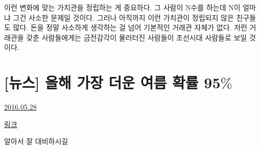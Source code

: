 이런 변화에 맞는 가치관을 정립하는 게 중요하다. 그 사람이 N수를 하는데 N이 얼마냐 그건 사소한 문제일 것이다.
그러나 아직까지 이런 가치관이 정립되지 않은 친구들도 많다. 돈을 정말 사소하게 생각하는 걸 넘어 기본적인 거래관 자체가 없다.
저런 거래관을 갖춘 사람들에게는 금전감각이 물러터진 사람들이 조선시대 사람들로 보일 것이다.
\vspace{5mm}






\section{[뉴스] 올해 가장 더운 여름 확률 95$\%$}
\href{https://www.kockoc.com/Apoc/795983}{2016.05.28}

\vspace{5mm}

\href{http://news.naver.com/main/read.nhn?mode=LSD&mid=sec&sid1=104&oid=016&aid=0001053552}{링크}

\noindent{}

알아서 잘 대비하시길
